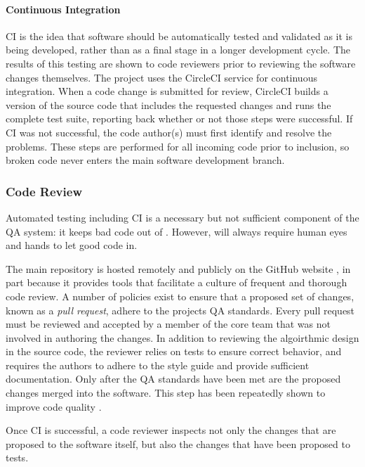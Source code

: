 \paragraph{Continuous Integration}

\Gls{CI} is the idea that software should be automatically tested
and validated as it is being developed, rather than as a final stage in a
longer development cycle.  The results of this
testing are shown to code reviewers prior to reviewing the software changes themselves.  The \Cyclus
project uses the CircleCI \cite{biggar_circleci_2015} service for continuous integration.
When a code change is submitted for review, CircleCI builds a version of the \Cyclus
source code that includes the requested changes and runs the complete test
suite, reporting back whether or not those steps were successful. If \gls{CI}
was not successful, the code author(s) must first identify and resolve the 
problems.  These steps are performed for all incoming code prior to inclusion, 
so broken code never enters the main software development branch.

\subsubsection{Code Review}
\label{sec:qa-review}

Automated testing including \gls{CI} is a necessary but not sufficient
component of the \Cyclus \gls{QA} system: it keeps bad code out of
\Cyclus. However, \Cyclus will always require human eyes and hands to let good
code in.  

The main \Cyclus repository is hosted remotely and publicly on the GitHub
website \cite{dabbish_social_2012}, in part because it provides tools that
facilitate a culture of frequent and thorough code review.  A number of
policies exist to ensure that a proposed set of changes, known as a \emph{pull
  request}, adhere to the projects \gls{QA} standards. Every pull request must
be reviewed and accepted by a member of the \Cyclus core team that was not
involved in authoring the changes.  In addition to reviewing the algoirthmic
design in the source code, the reviewer relies on tests to ensure correct
behavior, and requires the authors to adhere to the style guide and provide
sufficient documentation.  Only after the \gls{QA} standards have been met are
the proposed changes merged into the software. This step has been repeatedly
shown to improve code quality \cite{cohen_modern_2010}.

Once \gls{CI} is successful, a code reviewer inspects not only the changes that 
are proposed to the software itself, but also the changes that have been 
proposed to tests.  

